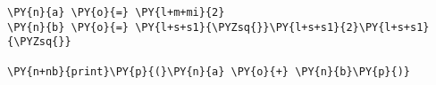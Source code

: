 \begin{Verbatim}[label=\makebox{\href{https://github.com/unipi-physics-labs/statnotes/tree/main/snippy/integer_string.py}{https://github.com/.../integer\_string.py}},commandchars=\\\{\}]
\PY{n}{a} \PY{o}{=} \PY{l+m+mi}{2}
\PY{n}{b} \PY{o}{=} \PY{l+s+s1}{\PYZsq{}}\PY{l+s+s1}{2}\PY{l+s+s1}{\PYZsq{}}

\PY{n+nb}{print}\PY{p}{(}\PY{n}{a} \PY{o}{+} \PY{n}{b}\PY{p}{)}
\end{Verbatim}

